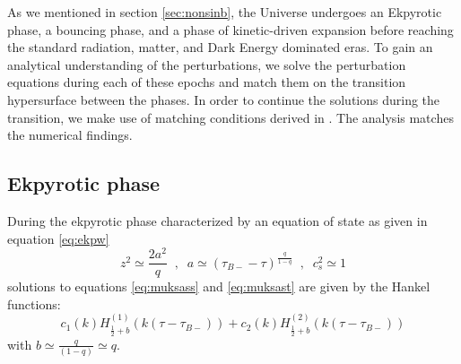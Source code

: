 \documentclass[12pt,a4paper]{article}
\numberwithin{equation}{section}
\numberwithin{equation}{section}
\begin{document}
As we mentioned in section \ref{sec:nonsinb}, the Universe undergoes an Ekpyrotic phase, a bouncing phase, and a phase of kinetic-driven expansion before reaching the standard radiation, matter, and Dark Energy dominated eras. To gain an analytical understanding of the perturbations, we solve the perturbation equations during each of these epochs and match them on the transition hypersurface between the phases. In order to continue the solutions during the transition, we make use of matching conditions derived in \cite{Hwang:1991an,Deruelle:1995kd}. The analysis matches the numerical findings. \\
\subsection{Ekpyrotic phase}
During the ekpyrotic phase characterized by an equation of state as given in equation \eqref{eq:ekpw}
\begin{equation}
    z^2 \simeq \frac{2 a^2}{q} \;\;,\;\;  a \simeq (\tau_{B-}-\tau )^{\frac{q}{1-q}} \;\;,\;\; c_s^2 \simeq 1
\end{equation}
solutions to equations \eqref{eq:muksass} and \eqref{eq:muksast} are given by the Hankel functions:
\begin{equation}
    c_1(k) H_{\frac{1}{2}+b}^{(1)}(k( \tau-\tau_{B-})) +  c_2(k) H_{\frac{1}{2}+b}^{(2)}(k (\tau-\tau_{B-}))
\end{equation}
with $b\simeq\frac{q}{(1-q)}\simeq q$.
\end{document}
